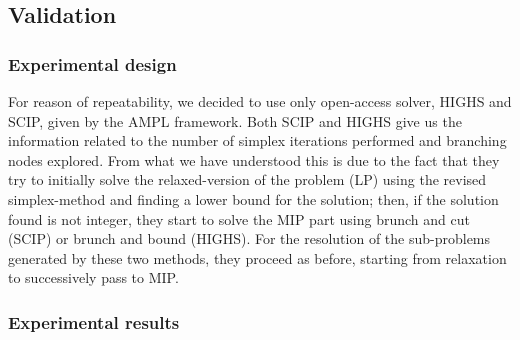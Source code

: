 \subsection{Validation}

\subsubsection{Experimental design}
For reason of repeatability, we decided to use only open-access solver, HIGHS and SCIP, given by the AMPL framework.
Both SCIP and HIGHS give us the information related to the number of simplex iterations performed and branching nodes explored. From what we have understood this is due to the fact that they try to initially solve the relaxed-version of the problem (LP) using the revised simplex-method and finding a lower bound for the solution; then, if the solution found is not integer, they start to solve the MIP part using brunch and cut (SCIP) or brunch and bound (HIGHS). For the resolution of the sub-problems generated by these two methods, they proceed as before, starting from relaxation to successively pass to MIP.

\subsubsection{Experimental results}

